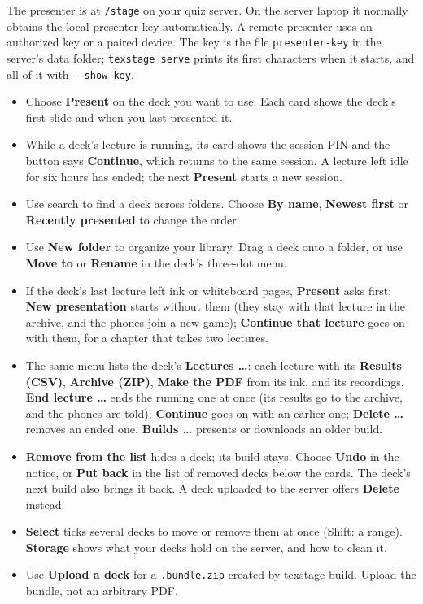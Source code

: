 \documentclass[a4paper,11pt]{article}
\begin{document}
\label{sec:choose-a-deck}
The presenter is at \texttt{/\allowbreak{}stage} on your quiz server.\allowbreak{} On the server laptop it normally obtains the local presenter key automatically.\allowbreak{} A remote presenter uses an authorized key or a paired device.\allowbreak{} The key is the file \texttt{presenter-\allowbreak{}key} in the server's data folder; \texttt{texstage serve} prints its first characters when it starts, and all of it with \texttt{-\allowbreak{}-\allowbreak{}show-\allowbreak{}key}.\par

\begin{itemize}
\item Choose \textbf{Present} on the deck you want to use.\allowbreak{} Each card shows the deck's first slide and when you last presented it.
\item While a deck's lecture is running, its card shows the session PIN and the button says \textbf{Continue}, which returns to the same session.\allowbreak{} A lecture left idle for six hours has ended; the next \textbf{Present} starts a new session.
\item Use search to find a deck across folders.\allowbreak{} Choose \textbf{By name}, \textbf{Newest first} or \textbf{Recently presented} to change the order.
\item Use \textbf{New folder} to organize your library.\allowbreak{} Drag a deck onto a folder, or use \textbf{Move to} or \textbf{Rename} in the deck's three-\allowbreak{}dot menu.
\item If the deck's last lecture left ink or whiteboard pages, \textbf{Present} asks first: \textbf{New presentation} starts without them (they stay with that lecture in the archive, and the phones join a new game); \textbf{Continue that lecture} goes on with them, for a chapter that takes two lectures.
\item The same menu lists the deck's \textbf{Lectures …}: each lecture with its \textbf{Results (CSV)}, \textbf{Archive (ZIP)}, \textbf{Make the PDF} from its ink, and its recordings.\allowbreak{} \textbf{End lecture …} ends the running one at once (its results go to the archive, and the phones are told); \textbf{Continue} goes on with an earlier one; \textbf{Delete …} removes an ended one.\allowbreak{} \textbf{Builds …} presents or downloads an older build.
\item \textbf{Remove from the list} hides a deck; its build stays.\allowbreak{} Choose \textbf{Undo} in the notice, or \textbf{Put back} in the list of removed decks below the cards.\allowbreak{} The deck's next build also brings it back.\allowbreak{} A deck uploaded to the server offers \textbf{Delete} instead.
\item \textbf{Select} ticks several decks to move or remove them at once (Shift: a range).\allowbreak{} \textbf{Storage} shows what your decks hold on the server, and how to clean it.
\item Use \textbf{Upload a deck} for a \texttt{.\allowbreak{}bundle.\allowbreak{}zip} created by texstage build.\allowbreak{} Upload the bundle, not an arbitrary PDF.
\end{itemize}
\end{document}
